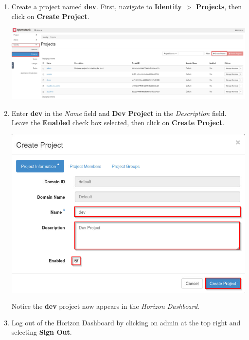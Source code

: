 \documentclass[letterpaper, 12pt]{article}
\begin{document}
\begin{enumerate}
    \item Create a project named \textbf{dev}. First, navigate to \textbf{Identity $>$ Projects}, then click on
    \textbf{Create Project}.

    \begin{center}
        \includegraphics[width=\linewidth]{images/part1/step5.png}
    \end{center}

    \item Enter \textbf{dev} in the \textit{Name} field and \textbf{Dev Project} in the \textit{Description} field.
    Leave the \textbf{Enabled} check box selected, then click on \textbf{Create Project}.

    \begin{center}
        \includegraphics[width=\linewidth]{images/part1/step6.png}
    \end{center}

    \begin{notebox}
        Notice the \textbf{dev} project now appears in the \textit{Horizon Dashboard}.
    \end{notebox}

    \item Log out of the Horizon Dashboard by clicking on admin at the top right and selecting \textbf{Sign Out}.
    

\end{enumerate}
\end{document}
